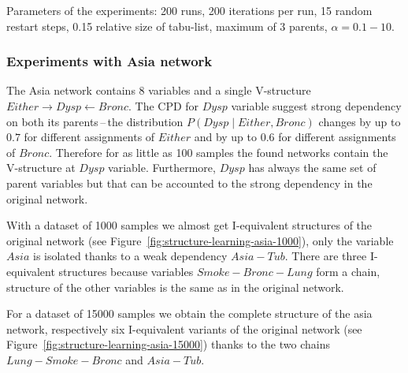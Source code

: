 \documentclass[english,cover]{fitthesis} %
\begin{document}
Parameters of the experiments: 200 runs, 200 iterations per run, 15 random restart steps, 0.15 relative size of tabu-list, maximum of 3 parents, $\alpha=0.1 - 10$.


\subsubsection{Experiments with Asia network}
The Asia network contains 8 variables and a single V-structure $Either \rightarrow Dysp \leftarrow Bronc$. The CPD for $Dysp$ variable suggest strong dependency on both its parents\,--\,the distribution $P(Dysp \mid Either, Bronc)$ changes by up to $0.7$ for different assignments of $Either$ and by up to $0.6$ for different assignments of $Bronc$. Therefore for as little as 100 samples the found networks contain the V-structure at $Dysp$ variable. Furthermore, $Dysp$ has always the same set of parent variables but that can be accounted to the strong dependency in the original network.

With a dataset of 1000 samples we almost get I-equivalent structures of the original network (see Figure~\ref{fig:structure-learning-asia-1000}), only the variable $Asia$ is isolated thanks to a weak dependency $Asia - Tub$. There are three I-equivalent structures because variables $Smoke - Bronc - Lung$ form a chain, structure of the other variables is the same as in the original network. 

For a dataset of 15000 samples we obtain the complete structure of the asia network, respectively six I-equivalent variants of the original network (see Figure~\ref{fig:structure-learning-asia-15000}) thanks to the two chains $Lung - Smoke - Bronc$ and $Asia - Tub$.
\end{document}
